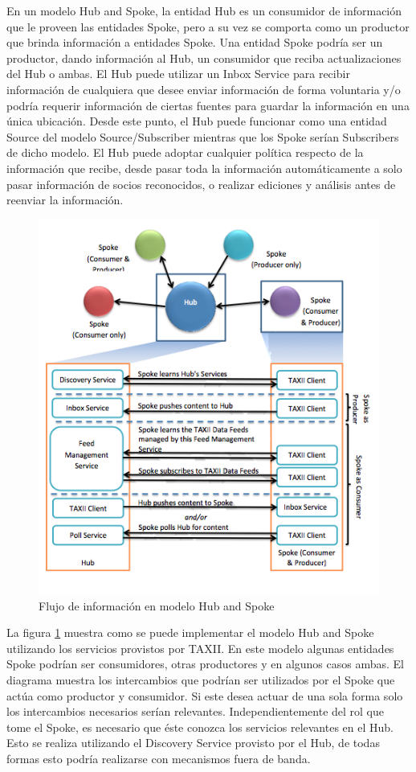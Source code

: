 En un modelo Hub and Spoke, la entidad Hub es un consumidor de 
información que le proveen las entidades Spoke, pero a su vez se comporta como
un productor que brinda información a entidades 
Spoke. Una entidad Spoke podría ser un productor, dando información al Hub, un 
consumidor que reciba actualizaciones del Hub o ambas. El Hub puede utilizar un 
Inbox Service para recibir información de cualquiera que desee enviar 
información de forma voluntaria y/o podría requerir información de ciertas 
fuentes para guardar la información en una única ubicación. Desde este punto, el 
Hub puede funcionar como una entidad Source del modelo Source/Subscriber 
mientras que los Spoke serían Subscribers de dicho modelo. El Hub puede adoptar 
cualquier política respecto de la información que recibe, desde pasar toda la 
información automáticamente a solo pasar información de socios reconocidos, o 
realizar ediciones y análisis antes de reenviar la información.

\begin{figure}[ht!]
  \centering
    \includegraphics[scale=0.75]{./images/HubAndSpokeModel.png}
    \caption{Flujo de información en modelo Hub and Spoke \protect\cite{b1}}
    \label{fig.hubandspokemodel}
\end{figure}

La figura \ref{fig.hubandspokemodel} muestra como se puede implementar el modelo Hub and Spoke 
utilizando los servicios provistos por TAXII. En este modelo algunas entidades 
Spoke podrían ser consumidores, otras productores y en algunos casos ambas. El 
diagrama muestra los intercambios que podrían ser utilizados por el Spoke que 
actúa como productor y consumidor. Si este desea actuar de una sola forma solo 
los intercambios necesarios serían relevantes. Independientemente del rol que 
tome el Spoke, es necesario que éste conozca los servicios relevantes en el Hub. 
Esto se realiza utilizando el Discovery Service provisto por el Hub, de todas 
formas esto podría realizarse con mecanismos fuera de banda.



